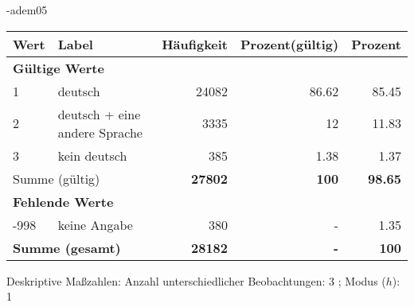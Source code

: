                 \vspace*{-\baselineskip}
					\begin{filecontents}{\jobname-adem05}
					\begin{longtable}{lXrrr}
					\toprule
					\textbf{Wert} & \textbf{Label} & \textbf{Häufigkeit} & \textbf{Prozent(gültig)} & \textbf{Prozent} \\
					\endhead
					\midrule
					\multicolumn{5}{l}{\textbf{Gültige Werte}}\\

					1 &
					\multicolumn{1}{X}{ deutsch   } &


					  \num{24082} &
					  \num[round-mode=places,round-precision=2]{86.62} &
					    \num[round-mode=places,round-precision=2]{85.45} \\

					2 &
					\multicolumn{1}{X}{ deutsch + eine andere Sprache   } &


					  \num{3335} &
					  \num[round-mode=places,round-precision=2]{12} &
					    \num[round-mode=places,round-precision=2]{11.83} \\

					3 &
					\multicolumn{1}{X}{ kein deutsch   } &


					  \num{385} &
					  \num[round-mode=places,round-precision=2]{1.38} &
					    \num[round-mode=places,round-precision=2]{1.37} \\
					\midrule
					\multicolumn{2}{l}{Summe (gültig)} &
					  \textbf{\num{27802}} &
					\textbf{\num{100}} &
					  \textbf{\num[round-mode=places,round-precision=2]{98.65}} \\
					\multicolumn{5}{l}{\textbf{Fehlende Werte}}\\
							-998 &
							keine Angabe &
							  \num{380} &
							 - &
							  \num[round-mode=places,round-precision=2]{1.35} \\
					\midrule
					\multicolumn{2}{l}{\textbf{Summe (gesamt)}} &
				      \textbf{\num{28182}} &
				    \textbf{-} &
				    \textbf{\num{100}} \\
					\bottomrule
					\end{longtable}
					\end{filecontents}
				\label{tableValues:adem05}
				\vspace*{-\baselineskip}
                    \begin{noten}
                	    \note{} Deskriptive Maßzahlen:
                	    Anzahl unterschiedlicher Beobachtungen: 3%
                	    ; 
                	      Modus ($h$): 1
                     \end{noten}

